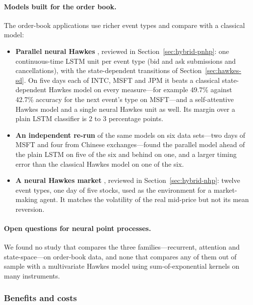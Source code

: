 \paragraph{Models built for the order book.} The order-book applications use richer event types and compare with a
classical model:
\begin{itemize}[leftmargin=1.5em,itemsep=2pt]
\item \textbf{Parallel neural Hawkes} \citep{shi2022sdpnhp}, reviewed in Section~\ref{sec:hybrid-pnhp}: one
  continuous-time LSTM unit per event type (bid and ask submissions and cancellations), with the state-dependent
  transitions of Section~\ref{sec:hawkes-sd}. On five days each of INTC, MSFT and JPM it beats a classical
  state-dependent Hawkes model on every measure---for example 49.7\% against 42.7\% accuracy for the next event's
  type on MSFT---and a self-attentive Hawkes model and a single neural Hawkes unit as well. Its margin over a plain
  LSTM classifier is 2 to 3 percentage points.
\item \textbf{An independent re-run} \citep{zheng2024lobdif} of the same models on six data sets---two days of MSFT
  and four from Chinese exchanges---found the parallel model ahead of the plain LSTM on five of the six and behind
  on one, and a larger timing error than the classical Hawkes model on one of the six.
\item \textbf{A neural Hawkes market} \citep{lalor2025nhp}, reviewed in Section~\ref{sec:hybrid-nhp}: twelve event
  types, one day of five stocks, used as the environment for a market-making agent. It matches the volatility of
  the real mid-price but not its mean reversion.
\end{itemize}

\paragraph{Open questions for neural point processes.} We found no study that compares the three families---recurrent, attention and
state-space---on order-book data, and none that compares any of them out of sample with a multivariate Hawkes
model using sum-of-exponential kernels on many instruments.

\subsubsection{Benefits and costs}
\label{sec:npp-when}

